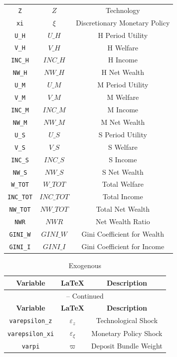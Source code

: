 \begin{center}
\begin{longtable}{ccc}
\texttt{Z} & $Z$ & Technology\\
\texttt{xi} & $\xi$ & Discretionary Monetary Policy\\
\texttt{U\_H} & $U\_H$ & H Period Utility\\
\texttt{V\_H} & $V\_H$ & H Welfare\\
\texttt{INC\_H} & $INC\_H$ & H Income\\
\texttt{NW\_H} & $NW\_H$ & H Net Wealth\\
\texttt{U\_M} & $U\_M$ & M Period Utility\\
\texttt{V\_M} & $V\_M$ & M Welfare\\
\texttt{INC\_M} & $INC\_M$ & M Income\\
\texttt{NW\_M} & $NW\_M$ & M Net Wealth\\
\texttt{U\_S} & $U\_S$ & S Period Utility\\
\texttt{V\_S} & $V\_S$ & S Welfare\\
\texttt{INC\_S} & $INC\_S$ & S Income\\
\texttt{NW\_S} & $NW\_S$ & S Net Wealth\\
\texttt{W\_TOT} & $W\_TOT$ & Total Welfare\\
\texttt{INC\_TOT} & $INC\_TOT$ & Total Income\\
\texttt{NW\_TOT} & $NW\_TOT$ & Total Net Wealth\\
\texttt{NWR} & $NWR$ & Net Wealth Ratio\\
\texttt{GINI\_W} & $GINI\_W$ & Gini Coefficient for Wealth\\
\texttt{GINI\_I} & $GINI\_I$ & Gini Coefficient for Income\\
\hline%
\end{longtable}
\end{center}
\begin{center}
\begin{longtable}{ccc}
\caption{Exogenous}\\%
\hline%
\multicolumn{1}{c}{\textbf{Variable}} &
\multicolumn{1}{c}{\textbf{\LaTeX}} &
\multicolumn{1}{c}{\textbf{Description}}\\%
\hline\hline%
\endfirsthead
\multicolumn{3}{c}{{\tablename} \thetable{} -- Continued}\\%
\hline%
\multicolumn{1}{c}{\textbf{Variable}} &
\multicolumn{1}{c}{\textbf{\LaTeX}} &
\multicolumn{1}{c}{\textbf{Description}}\\%
\hline\hline%
\endhead
\texttt{varepsilon\_z} & $\varepsilon_z$ & Technological Shock\\
\texttt{varepsilon\_xi} & $\varepsilon_\xi$ & Monetary Policy Shock\\
\texttt{varpi} & $\varpi$ & Deposit Bundle Weight\\
\hline%
\end{longtable}
\end{center}
